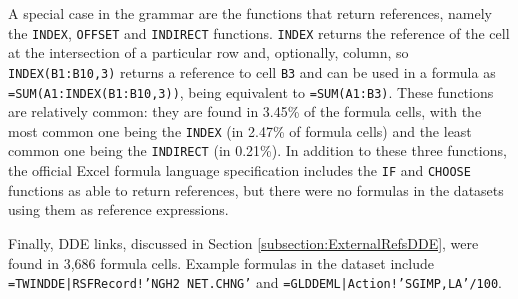 \documentclass[conference]{IEEEtran}
\begin{document}
A special case in the grammar are the functions that return references, namely the \texttt{INDEX}, \texttt{OFFSET} and  \texttt{INDIRECT} functions. \texttt{INDEX} returns the reference of the cell at the intersection of a particular row and, optionally, column, so \texttt{INDEX(B1:B10,3)} returns a reference to cell \texttt{B3} and can be used in a formula as \texttt{=SUM(A1:INDEX(B1:B10,3))}, being equivalent to \texttt{=SUM(A1:B3)}. These functions are relatively common: they are found in 3.45\% of the formula cells, with the most common one being the \texttt{INDEX} (in 2.47\% of formula cells) and the least common one being the \texttt{INDIRECT} (in 0.21\%). In addition to these three functions, the official Excel formula language specification includes the \texttt{IF} and \texttt{CHOOSE} functions as able to return references, but there were no formulas in the datasets using them as reference expressions.

Finally, DDE links, discussed in Section \ref{subsection:ExternalRefsDDE}, were found in 3,686 formula cells. Example formulas in the dataset include \texttt{=TWINDDE|RSFRecord!'NGH2 NET.CHNG'} and \texttt{=GLDDEML|Action!'SGIMP,LA'/100}.
\end{document}
